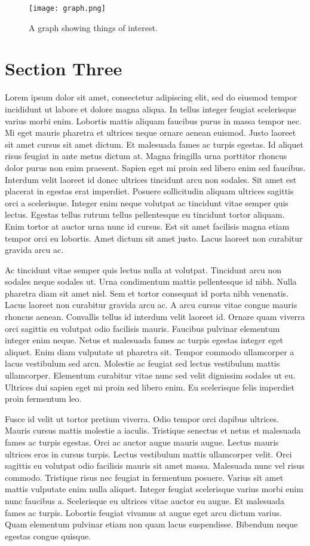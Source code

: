 \documentclass{ledger}
\begin{document}
\begin{figure}
\centering
\captionsetup{justification=centering}
\texttt{[image: graph.png]}
    \caption{A graph showing things of interest.}
    \label{graph1}
\end{figure}


\section{Section Three}
Lorem ipsum dolor sit amet, consectetur adipiscing elit, sed do eiusmod tempor incididunt ut labore et dolore magna aliqua. In tellus integer feugiat scelerisque varius morbi enim. Lobortis mattis aliquam faucibus purus in massa tempor nec. Mi eget mauris pharetra et ultrices neque ornare aenean euismod. Justo laoreet sit amet cursus sit amet dictum. Et malesuada fames ac turpis egestas. Id aliquet risus feugiat in ante metus dictum at. Magna fringilla urna porttitor rhoncus dolor purus non enim praesent. Sapien eget mi proin sed libero enim sed faucibus. Interdum velit laoreet id donec ultrices tincidunt arcu non sodales. Sit amet est placerat in egestas erat imperdiet. Posuere sollicitudin aliquam ultrices sagittis orci a scelerisque. Integer enim neque volutpat ac tincidunt vitae semper quis lectus. Egestas tellus rutrum tellus pellentesque eu tincidunt tortor aliquam. Enim tortor at auctor urna nunc id cursus. Est sit amet facilisis magna etiam tempor orci eu lobortis. Amet dictum sit amet justo. Lacus laoreet non curabitur gravida arcu ac.

Ac tincidunt vitae semper quis lectus nulla at volutpat. Tincidunt arcu non sodales neque sodales ut. Urna condimentum mattis pellentesque id nibh. Nulla pharetra diam sit amet nisl. Sem et tortor consequat id porta nibh venenatis. Lacus laoreet non curabitur gravida arcu ac. A arcu cursus vitae congue mauris rhoncus aenean. Convallis tellus id interdum velit laoreet id. Ornare quam viverra orci sagittis eu volutpat odio facilisis mauris. Faucibus pulvinar elementum integer enim neque. Netus et malesuada fames ac turpis egestas integer eget aliquet. Enim diam vulputate ut pharetra sit. Tempor commodo ullamcorper a lacus vestibulum sed arcu. Molestie ac feugiat sed lectus vestibulum mattis ullamcorper. Elementum curabitur vitae nunc sed velit dignissim sodales ut eu. Ultrices dui sapien eget mi proin sed libero enim. Eu scelerisque felis imperdiet proin fermentum leo.

Fusce id velit ut tortor pretium viverra. Odio tempor orci dapibus ultrices. Mauris cursus mattis molestie a iaculis. Tristique senectus et netus et malesuada fames ac turpis egestas. Orci ac auctor augue mauris augue. Lectus mauris ultrices eros in cursus turpis. Lectus vestibulum mattis ullamcorper velit. Orci sagittis eu volutpat odio facilisis mauris sit amet massa. Malesuada nunc vel risus commodo. Tristique risus nec feugiat in fermentum posuere. Varius sit amet mattis vulputate enim nulla aliquet. Integer feugiat scelerisque varius morbi enim nunc faucibus a. Scelerisque eu ultrices vitae auctor eu augue. Et malesuada fames ac turpis. Lobortis feugiat vivamus at augue eget arcu dictum varius. Quam elementum pulvinar etiam non quam lacus suspendisse. Bibendum neque egestas congue quisque.
\end{document}
